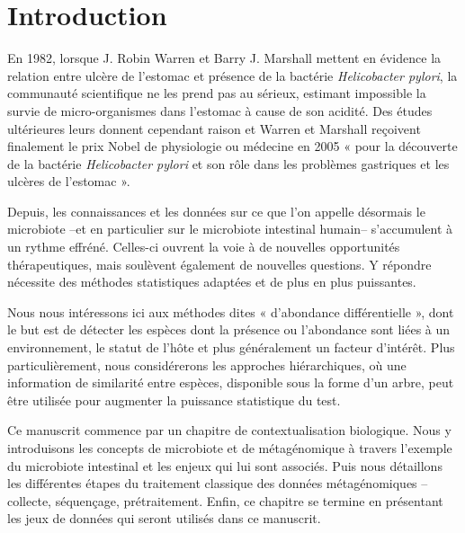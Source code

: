 \documentclass[12pt,a4paper]{reedthesis}
\theoremstyle{definition}
\theoremstyle{definition}
\theoremstyle{definition}
\theoremstyle{remark}
\begin{document}
  \hypersetup{linkcolor=black}
  \setcounter{tocdepth}{2}
  \tableofcontents

  \listoftables

  \listoffigures



\mainmatter %
\pagestyle{fancyplain} %

\hypertarget{introduction}{%
\chapter*{Introduction}\label{introduction}}

En 1982, lorsque J. Robin Warren et Barry J. Marshall mettent en évidence la relation entre ulcère de l'estomac et présence de la bactérie \emph{Helicobacter pylori}, la communauté scientifique ne les prend pas au sérieux, estimant impossible la survie de micro-organismes dans l'estomac à cause de son acidité. Des études ultérieures leurs donnent cependant raison et Warren et Marshall reçoivent finalement le prix Nobel de physiologie ou médecine en 2005 « pour la découverte de la bactérie \emph{Helicobacter pylori} et son rôle dans les problèmes gastriques et les ulcères de l'estomac ».

Depuis, les connaissances et les données sur ce que l'on appelle désormais le microbiote --et en particulier sur le microbiote intestinal humain-- s'accumulent à un rythme effréné. Celles-ci ouvrent la voie à de nouvelles opportunités thérapeutiques, mais soulèvent également de nouvelles questions. Y répondre nécessite des méthodes statistiques adaptées et de plus en plus puissantes.

Nous nous intéressons ici aux méthodes dites « d'abondance différentielle », dont le but est de détecter les espèces dont la présence ou l'abondance sont liées à un environnement, le statut de l'hôte et plus généralement un facteur d'intérêt. Plus particulièrement, nous considérerons les approches hiérarchiques, où une information de similarité entre espèces, disponible sous la forme d'un arbre, peut être utilisée pour augmenter la puissance statistique du test.

Ce manuscrit commence par un chapitre de contextualisation biologique. Nous y introduisons les concepts de microbiote et de métagénomique à travers l'exemple du microbiote intestinal et les enjeux qui lui sont associés. Puis nous détaillons les différentes étapes du traitement classique des données métagénomiques --collecte, séquençage, prétraitement. Enfin, ce chapitre se termine en présentant les jeux de données qui seront utilisés dans ce manuscrit.
\end{document}

